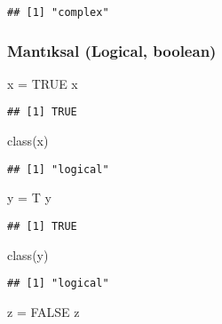 \documentclass[
]{book}
\newenvironment{Shaded}{\begin{snugshade}}{\end{snugshade}}
\newcommand{\ConstantTok}[1]{\textcolor[rgb]{0.00,0.00,0.00}{#1}}
\newcommand{\FunctionTok}[1]{\textcolor[rgb]{0.00,0.00,0.00}{#1}}
\newcommand{\NormalTok}[1]{#1}
\newcommand{\OtherTok}[1]{\textcolor[rgb]{0.56,0.35,0.01}{#1}}
\begin{document}
\begin{verbatim}
## [1] "complex"
\end{verbatim}

\hypertarget{mantux131ksal-logical-boolean}{%
\subsubsection{Mantıksal (Logical, boolean)}\label{mantux131ksal-logical-boolean}}

\begin{Shaded}
\begin{Highlighting}[]
\NormalTok{x }\OtherTok{=} \ConstantTok{TRUE}
\NormalTok{x}
\end{Highlighting}
\end{Shaded}

\begin{verbatim}
## [1] TRUE
\end{verbatim}

\begin{Shaded}
\begin{Highlighting}[]
\FunctionTok{class}\NormalTok{(x)}
\end{Highlighting}
\end{Shaded}

\begin{verbatim}
## [1] "logical"
\end{verbatim}

\begin{Shaded}
\begin{Highlighting}[]
\NormalTok{y }\OtherTok{=}\NormalTok{ T}
\NormalTok{y}
\end{Highlighting}
\end{Shaded}

\begin{verbatim}
## [1] TRUE
\end{verbatim}

\begin{Shaded}
\begin{Highlighting}[]
\FunctionTok{class}\NormalTok{(y)}
\end{Highlighting}
\end{Shaded}

\begin{verbatim}
## [1] "logical"
\end{verbatim}

\begin{Shaded}
\begin{Highlighting}[]
\NormalTok{z }\OtherTok{=} \ConstantTok{FALSE}
\NormalTok{z}
\end{Highlighting}
\end{Shaded}
\end{document}
